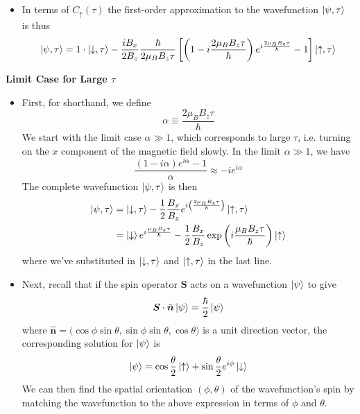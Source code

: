 \documentclass[11pt, a4paper]{article}
\renewcommand{\vec}[1]{\bm{#1}} %
\newcommand{\uvec}[1]{\hat{\vec{#1}}} %
\newcommand{\p}{\psi}  %
\newcommand{\ua}{\uparrow}  %
\newcommand{\da}{\downarrow}  %
\begin{document}
\begin{itemize}
	\item In terms of $ C_{\ua}(\tau) $ the first-order approximation to the wavefunction $ \ket{\p, \tau} $ is thus
	\begin{equation*}
		\ket{\p, \tau} = 1 \cdot \ket{\da, \tau} -\frac{iB_{x}}{2B_{z}} \frac{\hbar}{2\mu_{B}B_{z}\tau} \left[\left(1 - i \frac{2\mu_{B}B_{z}\tau}{\hbar}\right)e^{i\frac{2\mu_{B}B_{z}\tau}{\hbar}} - 1\right]\ket{\ua, \tau}
	\end{equation*}
\end{itemize}

\textbf{Limit Case for Large $ \tau $}
\begin{itemize}	
	\item First, for shorthand, we define
	\begin{equation*}
		\alpha \equiv \frac{2\mu_{B}B_{z}\tau}{\hbar}
	\end{equation*}
	We start with the limit case $ \alpha \gg 1 $, which corresponds to large $ \tau $, i.e. turning on the $ x $ component of the magnetic field slowly. In the limit $ \alpha \gg 1 $, we have
	\begin{equation*}
		\frac{(1 - i\alpha)e^{i\alpha}-1}{\alpha} \approx - i e^{i\alpha}
	\end{equation*}
	The complete wavefunction $ \ket{\p, \tau} $ is then
	\begin{align*}
		\ket{\p, \tau} &= \ket{\da, \tau} -\frac{1}{2}\frac{B_{x}}{B_{z}} e^{i\left(\frac{2\mu_{B}B_{z}\tau}{\hbar}\right)}\ket{\ua, \tau}\\
		& = \ket{\da}e^{i\frac{\mu_{B}B_{z}\tau}{\hbar}} - \frac{1}{2}\frac{B_{x}}{B_{z}}\exp\left(i \frac{\mu_{B}B_{z}\tau}{\hbar}\right)\ket{\ua}
	\end{align*}
	where we've substituted in $ \ket{\da, \tau} $ and $ \ket{\ua, \tau} $ in the last line.
	
	\item Next, recall that if the spin operator $ \vec{S} $ acts on a wavefunction $ \ket{\p} $ to give
	\begin{equation*}
		\vec{S}\cdot \uvec{n} \ket{\p} = \frac{\hbar}{2} \ket{\p}
	\end{equation*}
	where $ \uvec{n} = \big(\cos \phi \sin \theta, \sin \phi \sin \theta, \cos \theta\big) $ is a unit direction vector, the corresponding solution for $ \ket{\p} $ is
	\begin{equation*}
		\ket{\p} = \cos \frac{\theta}{2}\ket{\ua} + \sin \frac{\theta}{2}e^{i\phi}\ket{\da}
	\end{equation*}
	We can then find the spatial orientation $ (\phi, \theta) $ of the wavefunction's spin by matching the wavefunction to the above expression in terms of $ \phi $ and $ \theta $.
	

\end{itemize}
\end{document}
